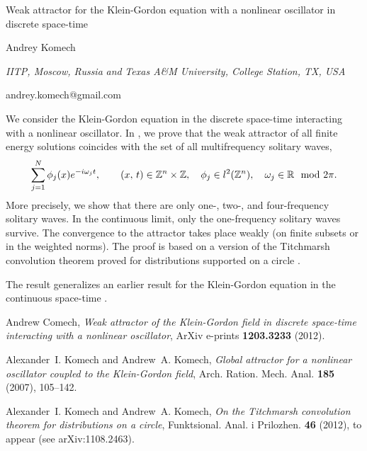\documentclass[10pt,a4paper]{article}
\def\R{\mathbb{R}}
\def\Z{\mathbb{Z}}
\begin{document}
\begin{center}

{\Large Weak attractor for the Klein-Gordon equation with a nonlinear oscillator in discrete space-time}

\bigskip


\bigskip

{\sc Andrey Komech}

{\small\it IITP, Moscow, Russia}
{\small\it and}
{\small\it Texas A\&M University, College Station, TX, USA}

{\small\rm andrey.komech@gmail.com}

\end{center}

\bigskip


We consider the Klein-Gordon equation
in the discrete space-time
interacting with a nonlinear oscillator.
In \cite{kg-discrete-arxiv},
we prove that the weak attractor of all
finite energy solutions
coincides with the set of all
multifrequency solitary waves,
\[
\sum\sb{j=1}\sp{N}\phi\sb j(x)e^{-i\omega\sb j t},
\qquad
(x,\,t)\in\Z^n\times\Z,
\quad
\phi\sb j\in l\sp 2(\Z^n),
\quad
\omega\sb j\in\R\mod 2\pi.
\]
More precisely, we show that
there are only one-, two-, and four-frequency solitary waves.
In the continuous limit,
only the one-frequency solitary waves survive.
The convergence to the attractor takes place weakly
(on finite subsets or in the weighted norms).
The proof is based on a version
of the Titchmarsh convolution
theorem proved for distributions
supported on a circle \cite{titchmarsh-circle}.

The result generalizes an earlier
result for the Klein-Gordon equation
in the continuous space-time \cite{ubk-arma}.

%
%

\begin{thebibliography}{6}

Andrew Comech, \emph{Weak attractor of the {K}lein-{G}ordon field in discrete
  space-time interacting with a nonlinear oscillator}, ArXiv e-prints
  \textbf{1203.3233} (2012).

Alexander~I. Komech and Andrew~A. Komech, \emph{Global attractor for a
  nonlinear oscillator coupled to the {K}lein-{G}ordon field}, Arch. Ration.
  Mech. Anal. \textbf{185} (2007), 105--142.

Alexander~I. Komech and Andrew~A. Komech, \emph{On the {T}itchmarsh convolution theorem for distributions on a
  circle}, Funktsional. Anal. i Prilozhen. \textbf{46} (2012), to appear (see
  arXiv:1108.2463).

\end{thebibliography}
\end{document}
